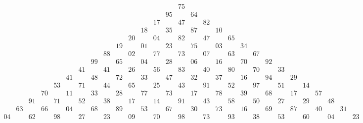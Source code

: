 \documentclass[oneside,12pt]{book}   	%
\newcounter{ex}
\newcounter{pr}
\theoremstyle{definition}
\begin{document}
\begin{spacing}{1.618}
\begin{landscape}
			\begin{alignat*}{4}
				\begin{array}{ccccccccccccccccccccccccccccc}
					&&&&&&&&&&&&&&75 \\
					&&&&&&&&&&&&&95 && 64 \\
					&&&&&&&&&&&&17 && 47 && 82 \\
					&&&&&&&&&&&18 &&35 &&87 && 10 \\
					&&&&&&&&&&20 && 04 && 82 && 47 && 65 \\
					&&&&&&&&&19 && 01 && 23 && 75 && 03 && 34 \\
					&&&&&&&&88 && 02 && 77 && 73 && 07 && 63 && 67 \\
					&&&&&&&99 && 65 && 04 && 28 && 06 && 16 && 70 && 92 \\
					&&&&&&41 && 41 && 26 && 56 && 83 && 40 && 80 && 70 && 33 \\
					&&&&&41 && 48 && 72 && 33 && 47 && 32 && 37 && 16 && 94 && 29 \\
					&&&&53 && 71 && 44 && 65 && 25 && 43 && 91 && 52 && 97 && 51 && 14 \\
					&&&70 && 11 && 33 && 28 && 77 && 73 && 17 && 78 && 39 && 68 && 17 && 57 \\
					&&91 && 71 && 52 && 38 && 17 && 14 && 91 && 43 && 58 && 50 && 27 && 29 && 48 \\
					& 63 && 66 && 04 && 68 && 89 && 53 && 67 && 30 && 73 && 16 && 69 && 87 && 40 && 31 \\
					04 && 62 && 98 && 27 && 23 && 09 && 70 && 98 && 73 && 93 && 38 && 53 && 60 && 04 && 23 
				\end{array}
			\end{alignat*}
\end{landscape}			
		
	
		
	\printindex
\end{spacing}
\end{document}
